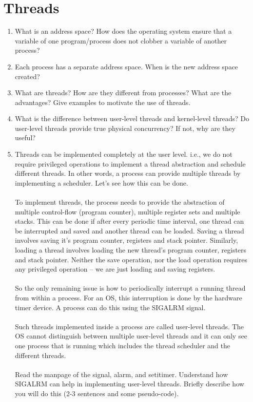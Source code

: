 \section{Threads}
\begin{enumerate}
\item What is an address space? How does the operating system ensure that a variable
of one program/process does not clobber a variable of another process?
\item Each process has a separate address space. When is the new address space created?
\item What are threads? How are they different from processes? What are the advantages?
Give examples to motivate the use of threads.
\item What is the difference between user-level threads and kernel-level threads?
Do user-level threads provide true physical concurrency? If not, why are they useful?

\item
Threads can be implemented completely at the user level. i.e., we do not require privileged operations to implement a thread abstraction and schedule different threads. In other words, a process can provide multiple threads by implementing a scheduler. Let's see how this can be done.
\\\\
To implement threads, the process needs to provide the abstraction of multiple control-flow (program counter), multiple register sets and multiple stacks. This can be done if after every periodic time interval, one thread can be interrupted and saved and another thread can be loaded. Saving a thread involves saving it's program counter, registers and stack pointer. Similarly, loading a thread involves loading the new thread's program counter, registers and stack pointer. Neither the save operation, nor the load operation requires any privileged operation -- we are just loading and saving registers.
\\\\
So the only remaining issue is how to periodically interrupt a running thread from within a process. For an OS, this interruption is done by the hardware timer device. A process can do this using the SIGALRM signal.
\\\\
Such threads implemented inside a process are called user-level threads. The OS cannot distinguish between multiple user-level threads and it can only see one process that is running which includes the thread scheduler and the different threads.
\\\\
Read the manpage of the signal, alarm, and setitimer. Understand how SIGALRM can help in
implementing user-level threads. Briefly describe how you will do
this (2-3 sentences and some pseudo-code). 


\end{enumerate}

